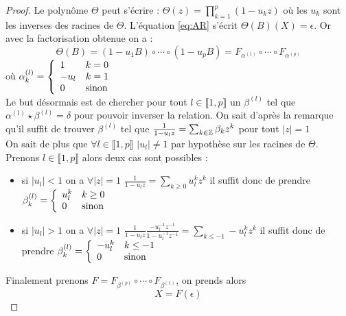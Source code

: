 \documentclass{report}
\begin{document}
\begin{proof}
Le polynôme $\Theta$ peut s'écrire : $\Theta(z)=\prod_{k=1}^p (1-u_k z)$ où les $u_k$ sont les inverses des racines de $\Theta$. L'équation \eqref{eq:AR} s'écrit $\Theta(B)(X)=\epsilon$. Or avec la factorisation obtenue on a : 
\[
\Theta(B) = (1-u_1 B) \circ \cdots \circ (1-u_p B) = F_{\alpha^{(1)}} \circ \cdots \circ F_{\alpha^{(p)}}
\]
où $\alpha_k^{(l)} = { \left\lbrace \begin{array}{ll} 
1 & k=0 \\
-u_l & k=1 \\
0 & \text{sinon} \\ \end{array} \right. }
$ \\
Le but désormais est de chercher pour tout $l \in \llbracket 1, p \rrbracket$ un $\beta^{(l)}$ tel que $\alpha^{(l)} \star \beta^{(l)} = \delta$ pour pouvoir inverser la relation. On sait d'après la remarque qu'il suffit de trouver $\beta^{(l)}$ tel que $\frac{1}{1-u_l z} = \sum_{k \in \mathbb{Z}} \beta_k z^k$ pour tout $|z|=1$ \\
On sait de plus que $\forall l \in \llbracket 1, p \rrbracket$ $|u_l| \neq 1$ par hypothèse sur les racines de $\Theta$.\\
Prenons $l\in \llbracket 1,p \rrbracket$ alors deux cas sont possibles :
\begin{itemize}
\item si $|u_l|< 1$ on a $\forall |z|=1$ $\frac{1}{1-u_l z} = \sum_{k \geq 0} u_l^k z^k$ il suffit donc de prendre $\beta_k^{(l)} = { \left\lbrace \begin{array}{ll} 
u_l^k & k \geq 0 \\
0 & \text{sinon} \\
 \end{array} \right. }$
\item si $|u_l|> 1$ on a $\forall |z|=1$ $\frac{1}{1-u_l z} \frac{-u_l^{-1} z^{-1}}{1-u_l^{-1} z^{-1}} = \sum_{k \leq -1} -u_l^k z^k$ il suffit donc de prendre $\beta_k^{(l)} = { \left\lbrace \begin{array}{ll} 
-u_l^k & k \leq -1 \\
0 & \text{sinon} \\
 \end{array} \right. }$
\end{itemize}
Finalement prenons $F = F_{\beta^{(p)}} \circ \cdots \circ F_{\beta^{(1)}}$, on prends alors 
\[
X = F(\epsilon) 
\]
\end{proof}
\end{document}
